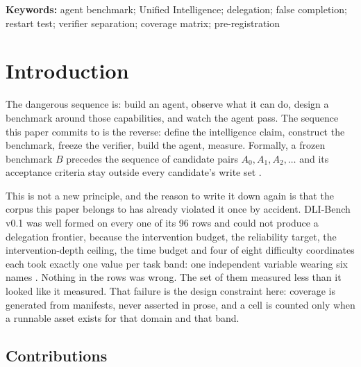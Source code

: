 \documentclass[11pt]{article}
\theoremstyle{definition}
\begin{document}
\begin{abstract}
and the validity requirements --- specification--key tests, concordance audits, graded scoring, headroom, termination reasons --- that every future binding must meet, because the benchmark this one replaces was well formed on every row and could not draw a frontier.
\end{abstract}

\noindent\textbf{Keywords:} agent benchmark; Unified Intelligence; delegation; false completion; restart test; verifier separation; coverage matrix; pre-registration

\tableofcontents
\bigskip

\section{Introduction}\label{sec:intro}

The dangerous sequence is: build an agent, observe what it can do, design a benchmark around those capabilities, and watch the agent pass. The sequence this paper commits to is the reverse: define the intelligence claim, construct the benchmark, freeze the verifier, build the agent, measure. Formally, a frozen benchmark $B$ precedes the sequence of candidate pairs $A_0, A_1, A_2, \ldots$ and its acceptance criteria stay outside every candidate's write set \citep{yang2026plan}.

This is not a new principle, and the reason to write it down again is that the corpus this paper belongs to has already violated it once by accident. DLI-Bench v0.1 was well formed on every one of its 96 rows and could not produce a delegation frontier, because the intervention budget, the reliability target, the intervention-depth ceiling, the time budget and four of eight difficulty coordinates each took exactly one value per task band: one independent variable wearing six names \citep{yang2026dlibench}. Nothing in the rows was wrong. The set of them measured less than it looked like it measured. That failure is the design constraint here: coverage is generated from manifests, never asserted in prose, and a cell is counted only when a runnable asset exists for that domain and that band.

\subsection{Contributions}
\end{document}
